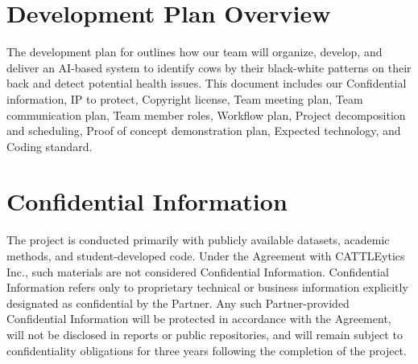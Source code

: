 \documentclass{article}
\begin{document}

\section*{Development Plan Overview}
The development plan for \progname{} outlines how our team will organize, develop, 
and deliver an AI-based system to identify cows by their black-white patterns on their back 
and detect potential health issues. This document includes our Confidential information, 
IP to protect, Copyright license, Team meeting plan, Team communication plan, Team member 
roles, Workflow plan, Project decomposition and scheduling, Proof of concept demonstration 
plan, Expected technology, and Coding standard.


\section{Confidential Information}


The project is conducted primarily with publicly available datasets, academic methods, and student-developed code. 
Under the Agreement with CATTLEytics Inc., such materials are not considered Confidential Information. 
Confidential Information refers only to proprietary technical or business information explicitly designated as confidential by the Partner. 
Any such Partner-provided Confidential Information will be protected in accordance with the Agreement, will not be disclosed in reports or 
public repositories, and will remain subject to confidentiality obligations for three years following the completion of the project.
\end{document}
